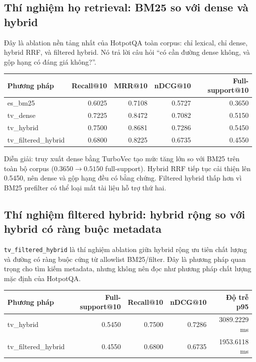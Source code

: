 \documentclass[11pt,a4paper]{article}
\newcommand{\method}[1]{\texttt{#1}}
\begin{document}
\subsection{Thí nghiệm họ retrieval: BM25 so với dense và hybrid}

Đây là ablation nền tảng nhất của HotpotQA toàn corpus: chỉ lexical, chỉ dense,
hybrid RRF, và filtered hybrid. Nó trả lời câu hỏi ``có cần đường dense không, và gộp hạng
có đáng giá không?''.

\begin{tabularx}{\textwidth}{>{\ttfamily\raggedright\arraybackslash}p{} r r r r}
\toprule
Phương pháp & Recall@10 & MRR@10 & nDCG@10 & Full-support@10 \\
\midrule
es\_bm25 & 0.6025 & 0.7108 & 0.5727 & 0.3650 \\
tv\_dense & 0.7225 & 0.8472 & 0.7082 & 0.5150 \\
tv\_hybrid & 0.7500 & 0.8681 & 0.7286 & 0.5450 \\
tv\_filtered\_hybrid & 0.6800 & 0.8225 & 0.6735 & 0.4550 \\
\bottomrule
\end{tabularx}

Diễn giải: truy xuất dense bằng TurboVec tạo mức tăng lớn so với BM25 trên toàn bộ corpus
($0.3650 \rightarrow 0.5150$ full-support). Hybrid RRF tiếp tục cải thiện lên 0.5450,
nên dense và gộp hạng đều có bằng chứng. Filtered hybrid thấp hơn vì BM25 prefilter có thể loại
mất tài liệu hỗ trợ thứ hai.

\subsection{Thí nghiệm filtered hybrid: hybrid rộng so với hybrid có ràng buộc metadata}

\method{tv\_filtered\_hybrid} là thí nghiệm ablation giữa hybrid rộng ưu tiên chất lượng và đường có ràng buộc cứng
từ allowlist BM25/filter. Đây là phương pháp quan trọng cho tìm kiếm metadata, nhưng không
nên đọc như phương pháp chất lượng mặc định của HotpotQA.

\begin{tabularx}{\textwidth}{>{\ttfamily\raggedright\arraybackslash}p{} r r r r}
\toprule
Phương pháp & Full-support@10 & Recall@10 & nDCG@10 & Độ trễ p95 \\
\midrule
tv\_hybrid & 0.5450 & 0.7500 & 0.7286 & 3089.2229 ms \\
tv\_filtered\_hybrid & 0.4550 & 0.6800 & 0.6735 & 1953.6118 ms \\
\bottomrule
\end{tabularx}
\end{document}
